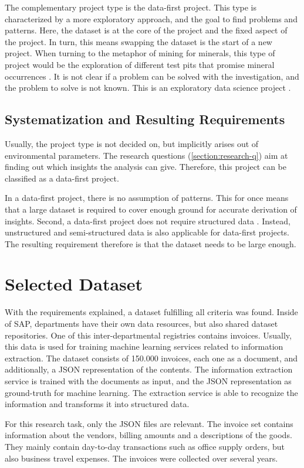 	The complementary project type is the data-first project. This type is characterized by a more exploratory approach, and the goal to find problems and patterns. Here, the dataset is at the core of the project and the fixed aspect of the project. In turn, this means swapping the dataset is the start of a new project. When turning to the metaphor of mining for minerals, this type of project would be the exploration of different test pits that promise mineral occurrences \cite[p.~3051]{dataScienceProjectTypes}. It is not clear if a problem can be solved with the investigation, and the problem to solve is not known. This is an exploratory data science project \cite[p.~3051]{dataScienceProjectTypes}.
	
	\subsection{Systematization and Resulting Requirements}
	Usually, the project type is not decided on, but implicitly arises out of environmental parameters. The research questions (\ref{section:research-q}) aim at finding out which insights the analysis can give. Therefore, this project can be classified as a data-first project.

	In a data-first project, there is no assumption of patterns. This for once means that a large dataset is required to cover enough ground for accurate derivation of insights. Second, a data-first project does not require structured data \cite{srivastavaDataMining}. Instead, unstructured and semi-structured data is also applicable for data-first projects. The resulting requirement therefore is that the dataset needs to be large enough.
	
	
	\section{Selected Dataset}
	\label{section:selected-dataset}
	With the requirements explained, a dataset fulfilling all criteria was found. Inside of SAP, departments have their own data resources, but also shared dataset repositories. One of this inter-departmental registries contains invoices. Usually, this data is used for training machine learning services related to information extraction. The dataset consists of 150.000 invoices, each one as a document, and additionally, a \ac{JSON} representation of the contents.	The information extraction service is trained with the documents as input, and the \ac{JSON} representation as ground-truth for machine learning. The extraction service is able to recognize the information and transforms it into structured data.	
	
	For this research task, only the \ac{JSON} files are relevant. The invoice set contains information about the vendors, billing amounts and a descriptions of the goods. They mainly contain day-to-day transactions such as office supply orders, but also business travel expenses. The invoices were collected over several years.

	
	
